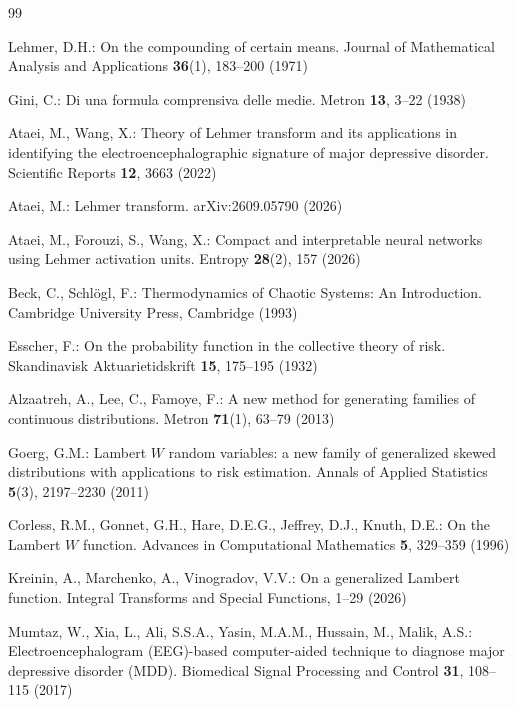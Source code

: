 \documentclass[sn-mathphys-num]{sn-jnl}\newcommand{\SNJNL}{}
\theoremstyle{thmstyleone}
\theoremstyle{thmstyletwo}
\theoremstyle{thmstylethree}
\theoremstyle{thmstyleone}
\begin{document}
	\begin{thebibliography}{99}
		
		Lehmer, D.H.: On the compounding of certain means. Journal of
		Mathematical Analysis and Applications \textbf{36}(1), 183--200
		(1971)
		
		Gini, C.: Di una formula comprensiva delle medie. Metron
		\textbf{13}, 3--22 (1938)
		
		Ataei, M., Wang, X.: Theory of Lehmer transform and its
		applications in identifying the electroencephalographic signature
		of major depressive disorder. Scientific Reports \textbf{12}, 3663
		(2022)
		
		Ataei, M.: Lehmer transform. arXiv:2609.05790 (2026)
		
		Ataei, M., Forouzi, S., Wang, X.: Compact and interpretable neural
		networks using Lehmer activation units. Entropy \textbf{28}(2), 157
		(2026)
		
		Beck, C., Schl\"ogl, F.: Thermodynamics of Chaotic Systems: An
		Introduction. Cambridge University Press, Cambridge (1993)
		
		Esscher, F.: On the probability function in the collective theory
		of risk. Skandinavisk Aktuarietidskrift \textbf{15}, 175--195 (1932)
		
		Alzaatreh, A., Lee, C., Famoye, F.: A new method for generating
		families of continuous distributions. Metron \textbf{71}(1), 63--79
		(2013)
		
		Goerg, G.M.: Lambert $W$ random variables: a new family of
		generalized skewed distributions with applications to risk
		estimation. Annals of Applied Statistics \textbf{5}(3), 2197--2230
		(2011)
		
		Corless, R.M., Gonnet, G.H., Hare, D.E.G., Jeffrey, D.J.,
		Knuth, D.E.: On the Lambert $W$ function. Advances in
		Computational Mathematics \textbf{5}, 329--359 (1996)
		
		Kreinin, A., Marchenko, A., Vinogradov, V.V.: On a generalized
		Lambert function. Integral Transforms and Special Functions, 1--29
		(2026)
		
		Mumtaz, W., Xia, L., Ali, S.S.A., Yasin, M.A.M., Hussain, M.,
		Malik, A.S.: Electroencephalogram (EEG)-based computer-aided
		technique to diagnose major depressive disorder (MDD). Biomedical
		Signal Processing and Control \textbf{31}, 108--115 (2017)
		

\end{thebibliography}
\end{document}
